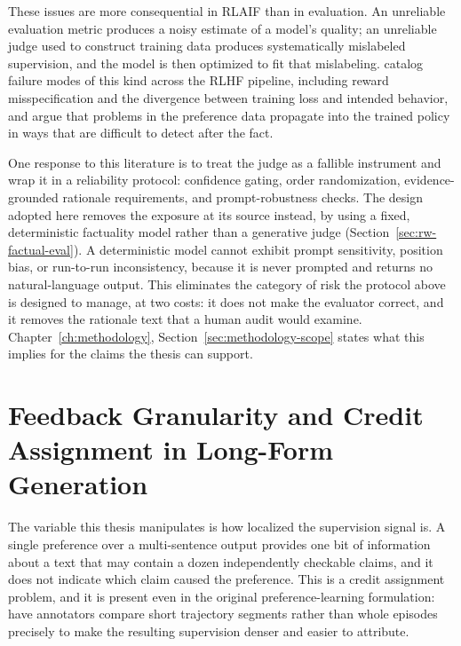 These issues are more consequential in RLAIF than in evaluation. An unreliable
evaluation metric produces a noisy estimate of a model's quality; an unreliable
judge used to construct training data produces systematically mislabeled
supervision, and the model is then optimized to fit that mislabeling.
\citet{casper2023open} catalog failure modes of this kind across the RLHF
pipeline, including reward misspecification and the divergence between training
loss and intended behavior, and argue that problems in the preference data
propagate into the trained policy in ways that are difficult to detect after the
fact.

One response to this literature is to treat the judge as a fallible instrument and
wrap it in a reliability protocol: confidence gating, order randomization,
evidence-grounded rationale requirements, and prompt-robustness checks. The design
adopted here removes the exposure at its source instead, by using a fixed,
deterministic factuality model rather than a generative judge
(Section~\ref{sec:rw-factual-eval}). A deterministic model cannot exhibit prompt
sensitivity, position bias, or run-to-run inconsistency, because it is never
prompted and returns no natural-language output. This eliminates the category of
risk the protocol above is designed to manage, at two costs: it does not make the
evaluator correct, and it removes the rationale text that a human audit would
examine. Chapter~\ref{ch:methodology}, Section~\ref{sec:methodology-scope} states
what this implies for the claims the thesis can support.

\section{Feedback Granularity and Credit Assignment in Long-Form Generation}
\label{sec:rw-finegrained}

The variable this thesis manipulates is how localized the supervision signal is.
A single preference over a multi-sentence output provides one bit of information
about a text that may contain a dozen independently checkable claims, and it does
not indicate which claim caused the preference. This is a credit assignment
problem, and it is present even in the original preference-learning formulation:
\citet{christiano2017deep} have annotators compare short trajectory segments
rather than whole episodes precisely to make the resulting supervision denser and
easier to attribute.

